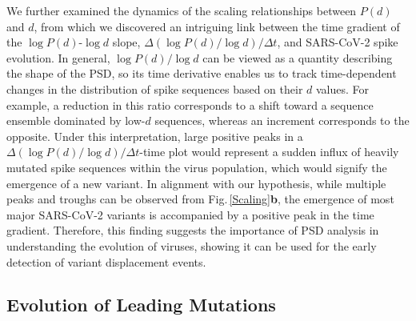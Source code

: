 \documentclass[%
 reprint,
superscriptaddress,
 amsmath,amssymb,
 aps,
]{revtex4-2}
\begin{document}
We further examined the dynamics of the scaling relationships between $P(\bm{\mathit{d}})$ and $\bm{\mathit{d}}$, from which we discovered an intriguing link between the time gradient of the $\log{P(\bm{\mathit{d}})}$-$\log{\bm{\mathit{d}}}$ slope, $\Delta (\log{P(\bm{\mathit{d}})} / \log{\bm{\mathit{d}}}) \big/ \Delta t$, and SARS-CoV-2 spike evolution. In general, $\log{P(\bm{\mathit{d}})} / \log{\bm{\mathit{d}}}$ can be viewed as a quantity describing the shape of the PSD, so its time derivative enables us to track time-dependent changes in the distribution of spike sequences based on their $\bm{\mathit{d}}$ values. For example, a reduction in this ratio corresponds to a shift toward a sequence ensemble dominated by low-$\bm{\mathit{d}}$ sequences, whereas an increment corresponds to the opposite. Under this interpretation, large positive peaks in a $\Delta (\log{P(\bm{\mathit{d}})} / \log{\bm{\mathit{d}}}) \big/ \Delta t$-time plot would represent a sudden influx of heavily mutated spike sequences within the virus population, which would signify the emergence of a new variant. In alignment with our hypothesis, while multiple peaks and troughs can be observed from Fig.\,\ref{Scaling}\textbf{b}, the emergence of most major SARS-CoV-2 variants is accompanied by a positive peak in the time gradient. Therefore, this finding suggests the importance of PSD analysis in understanding the evolution of viruses, showing it can be used for the early detection of variant displacement events.


\subsection{Evolution of Leading Mutations}
\end{document}
